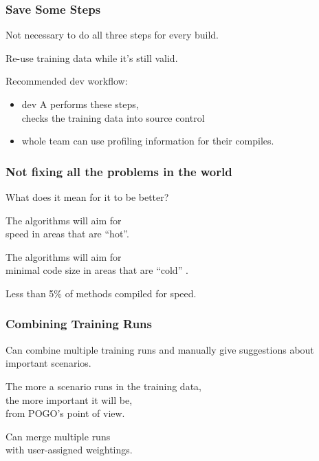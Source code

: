 \begin{frame}
\frametitle{Save Some Steps}

\large
\begin{changemargin}{2cm}
Not necessary to do all three steps for every build. 

Re-use training data while it's still valid.

Recommended dev workflow:
\begin{itemize}
\item dev A performs these steps, \\
checks the training data into source control
\item whole team can use profiling information for their compiles.
\end{itemize}
\end{changemargin}

\end{frame}



\begin{frame}
\frametitle{Not fixing all the problems in the world}

\large
\begin{changemargin}{2cm}
What does it mean for it to be better? 

The algorithms will aim for \\
speed in areas that are ``hot''. 

The algorithms will aim for \\
minimal code size in areas that are ``cold'' .

Less than 5\% of methods compiled for speed.
\end{changemargin}
\end{frame}



\begin{frame}
\frametitle{Combining Training Runs}

\large
\begin{changemargin}{2cm}
Can combine multiple training runs and manually give suggestions about important scenarios.

The more a scenario runs in the training data, \\
the more important it will be, \\
from POGO's point of view.

Can merge multiple runs \\
with user-assigned weightings.
\end{changemargin}

\end{frame}


